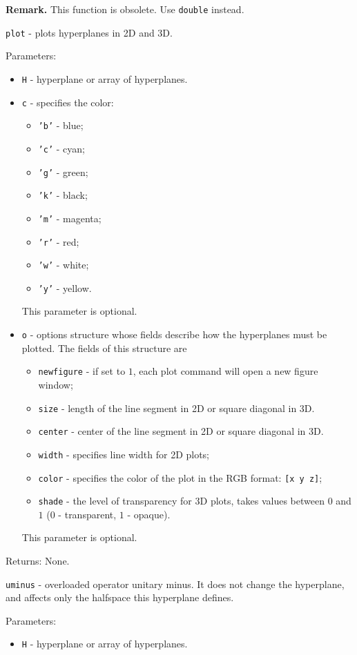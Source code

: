 {\bf Remark.} This function is obsolete. Use {\tt double} instead.

\newpage

{\Large {\tt plot}} - plots hyperplanes in 2D and 3D.

Parameters:
\begin{itemize}
\item {\tt H} - hyperplane or array of hyperplanes.
\item {\tt c} - specifies the color:
\begin{itemize}
\item {\tt 'b'} - blue;
\item {\tt 'c'} - cyan;
\item {\tt 'g'} - green;
\item {\tt 'k'} - black;
\item {\tt 'm'} - magenta;
\item {\tt 'r'} - red;
\item {\tt 'w'} - white;
\item {\tt 'y'} - yellow.
\end{itemize}
This parameter is optional.
\item {\tt o} - options structure whose fields describe how the hyperplanes
must be plotted. The fields of this structure are
\begin{itemize}
\item {\tt newfigure} - if set to $1$, each plot command will open a new
figure window;
\item {\tt size} - length of the line segment in 2D or square diagonal in 3D.
\item {\tt center} - center of the line segment in 2D or square diagonal in 3D.
\item {\tt width} - specifies line width for 2D plots;
\item {\tt color} - specifies the color of the plot in the RGB format:
{\tt [x y z]};
\item {\tt shade} - the level of transparency for 3D plots, takes values
between $0$ and $1$ ($0$ - transparent, $1$ - opaque).
\end{itemize}
This parameter is optional.
\end{itemize}

Returns: None.

\newpage

{\Large {\tt uminus}} - overloaded operator unitary minus. It does not change
the hyperplane, and affects only the halfspace this hyperplane defines.

Parameters:
\begin{itemize}
\item {\tt H} - hyperplane or array of hyperplanes.
\end{itemize}

